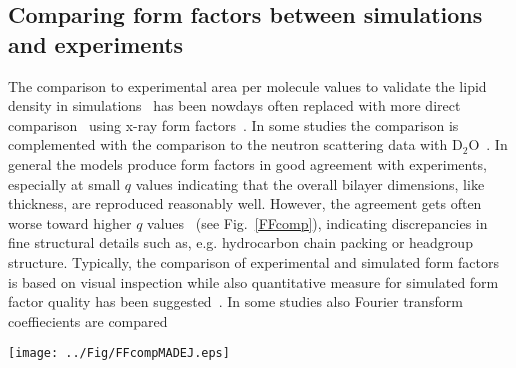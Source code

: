 \documentclass[aps,prl,superscriptaddress,twocolumn]{revtex4}
\begin{document}

\subsection{Comparing form factors between simulations and experiments}

The comparison to experimental area per molecule values to validate the lipid density in simulations~\cite{tieleman97} has
been nowdays often replaced with more direct comparison~\cite{nagle00} using x-ray form 
factors~\cite{hogberg08,chiu09,klauda10,dickson12,jambeck12,lim12,klauda12,jambeck13,chowdhary13,lee14,maciejewski14,dickson14,tjornhammar14,madej15,kulig15b}.
In some studies the comparison is complemented with the comparison to the neutron scattering 
data with D$_2$O~\cite{dickson12,jambeck12,lee14,dickson14,tjornhammar14,madej15}.
In general the models produce form factors in good agreement with experiments, especially at small $q$ values indicating 
that the overall bilayer dimensions, like thickness, are reproduced reasonably well. However, the agreement gets often worse
toward higher $q$ 
values~\cite{chiu09,klauda10,klauda12,dickson12,lim12,jambeck12,chowdhary13,jambeck13,lee14,maciejewski14,dickson14,kulig15b,madej15}
(see Fig.~\ref{FFcomp}), indicating discrepancies in fine structural details such as, e.g. hydrocarbon chain packing or headgroup structure.
Typically, the comparison of experimental and simulated form factors is based on visual inspection while also quantitative measure
for simulated form factor quality has been suggested~\cite{kucerka10}. In some studies also Fourier transform coeffiecients are
compared~\cite{benz05}
\begin{figure*}[]
  \texttt{[image: ../Fig/FFcompMADEJ.eps]}
\newline
  \caption{\label{FFcomp}
    Example comparison between Amber Lipid14 simulation model~\cite{madej15} and experiments~\cite{pan09,kucerka07b}.
    The agreement is better with low $q$ values of x-ray form factor and cholesterol induced thickening is overestimated.
    Figure adapted from Madej et al.~\cite{madej15}.
  } 
\end{figure*}
\end{document}
